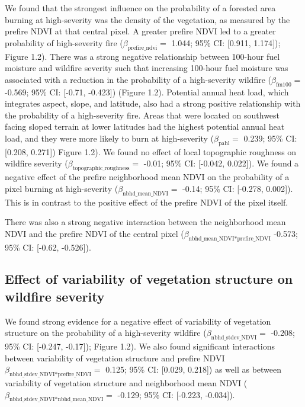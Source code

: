 \documentclass[twoside,12pt,final]{ucthesis-CA2012}
\begin{document}
\begin{ucmainmatter}
We found that the strongest influence on the probability of a forested
area burning at high-severity was the density of the vegetation, as
measured by the prefire NDVI at that central pixel. A greater prefire
NDVI led to a greater probability of high-severity fire
(\(\beta_{\text{prefire\_ndvi}}=\) 1.044; 95\% CI: {[}0.911, 1.174{]});
Figure 1.2). There was a strong negative relationship between 100-hour
fuel moisture and wildfire severity such that increasing 100-hour fuel
moisture was associated with a reduction in the probability of a
high-severity wildfire (\(\beta_{\text{fm100}}=\) -0.569; 95\% CI:
{[}-0.71, -0.423{]}) (Figure 1.2). Potential annual heat load, which
integrates aspect, slope, and latitude, also had a strong positive
relationship with the probability of a high-severity fire. Areas that
were located on southwest facing sloped terrain at lower latitudes had
the highest potential annual heat load, and they were more likely to
burn at high-severity (\(\beta_{\text{pahl}}=\) 0.239; 95\% CI:
{[}0.208, 0.271{]}) Figure 1.2). We found no effect of local topographic
roughness on wildfire severity
(\(\beta_{\text{topographic\_roughness}}=\) -0.01; 95\% CI: {[}-0.042,
0.022{]}). We found a negative effect of the prefire neighborhood mean
NDVI on the probability of a pixel burning at high-severity
(\(\beta_{\text{nbhd\_mean\_NDVI}}=\) -0.14; 95\% CI: {[}-0.278,
0.002{]}). This is in contrast to the positive effect of the prefire
NDVI of the pixel itself.

There was also a strong negative interaction between the neighborhood
mean NDVI and the prefire NDVI of the central pixel
(\(\beta_{\text{nbhd\_mean\_NDVI*prefire\_NDVI}}\) -0.573; 95\% CI:
{[}-0.62, -0.526{]}).

\subsection{Effect of variability of vegetation structure on wildfire
severity}\label{effect-of-variability-of-vegetation-structure-on-wildfire-severity}

We found strong evidence for a negative effect of variability of
vegetation structure on the probability of a high-severity wildfire
(\(\beta_{\text{nbhd\_stdev\_NDVI}}=\) -0.208; 95\% CI: {[}-0.247,
-0.17{]}); Figure 1.2). We also found significant interactions between
variability of vegetation structure and prefire NDVI
\(\beta_{\text{nbhd\_stdev\_NDVI*prefire\_NDVI}}=\) 0.125; 95\% CI:
{[}0.029, 0.218{]}) as well as between variability of vegetation
structure and neighborhood mean NDVI
(\(\beta_{\text{nbhd\_stdev\_NDVI*nbhd\_mean\_NDVI}}=\) -0.129; 95\% CI:
{[}-0.223, -0.034{]}).


\end{ucmainmatter}
\end{document}
